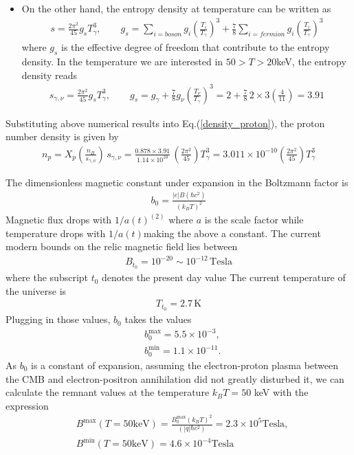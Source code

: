 \documentclass[Universe,article,submit,moreauthors,pdftex]{Definitions/mdpi}
\begin{document}
\begin{itemize}
  \item On the other hand, the entropy density at temperature can be written as \cite{Kolb:1990vq}
\begin{align}
s=\frac{2\pi^2}{45}g_sT_\gamma^3,\qquad g_s=\sum_{i=boson}g_i\left(\frac{T_i}{T_\gamma}\right)^3+\frac{7}{8}\sum_{i=fermion}g_i\left(\frac{T_i}{T_\gamma}\right)^3
\end{align}
where $g_s$ is the effective degree of freedom that contribute to the entropy density.  In the temperature we are interested in $50>T>20$keV, the entropy density reads
\begin{align}
s_{\gamma,\nu}=\frac{2\pi^2}{45}g_sT_\gamma^3,\qquad g_s=g_\gamma+\frac{7}{8}g_\nu\left(\frac{T_\nu}{T_\gamma}\right)^3=2+\frac{7}{8}\,2\times3\left(\frac{4}{11}\right)=3.91
\end{align}

\end{itemize}

Substituting above numerical results into Eq.(\ref{density_proton}), the proton number density is given by
\begin{align}
n_p= X_p\left(\frac{n_B}{s_{\gamma,\nu}}\right)\,s_{\gamma,\nu}=\frac{0.878\times3.91}{1.14\times10^{10}}\,\left(\frac{2\pi^2}{45}\right)T_\gamma^3=3.011\times10^{-10}\left(\frac{2\pi^2}{45}\right)T_\gamma^3
\end{align}


The dimensionless magnetic constant under expansion in the Boltzmann factor is
\begin{align}
b_0= \frac{|e|B(\hbar c^2)}{(k_B T)^2}
\end{align}
Magnetic flux drops with $1/a(t)^(2)$ where $a$ is the scale factor while temperature drops with $1/a(t)$making the above a constant. The current modern bounds on the relic magnetic field lies between
\begin{align}
B_{t_0}=10^{-20}\sim10^{-12}\,\mathrm{Tesla}
\end{align}
where the subscript $t_0$ denotes the present day value The current temperature of the universe is 
\begin{align}
T_{t_0}=2.7\,\mathrm{K}
\end{align}
Plugging in those values, $b_0$ takes the values
\begin{align}
&b_0^{\mathrm{max}}= 5.5\times10^{-3},\\
&b_0 ^{\mathrm{min}}= 1.1\times10^{-11}.
\end{align}
As $b_0$ is a constant of expansion, assuming the electron-proton plasma between the CMB and electron-positron annihilation did not greatly disturbed it, we can calculate the remnant values at the temperature $k_BT=50$ keV with the expression
\begin{align}
&B^{\mathrm{max}}(T=50 \mathrm{keV}) = \frac{B^{\mathrm{max}}_0(k_B T)^2}{(|q|\hbar c^2)}= 2.3\times10^5 \mathrm{Tesla},\\
&B^{\mathrm{min}}(T=50 \mathrm{keV})= 4.6\times10^{-4} \mathrm{Tesla}
\end{align}
\end{document}
